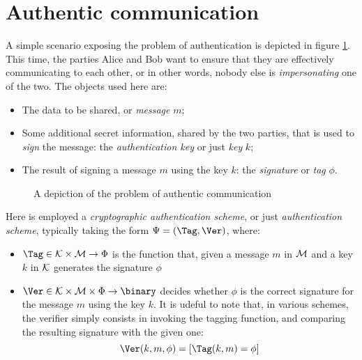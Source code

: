 
\section{Authentic communication}


A simple scenario exposing the problem of authentication is depicted in figure \ref{fig:authentication}. This time, the parties Alice and Bob want to ensure that they are effectively communicating to each other, or in other words, nobody else is \emph{impersonating} one of the two. The objects used here are:
\begin{itemize}
    \item The data to be shared, or \emph{message} $m$;
    \item Some additional secret information, shared by the two parties, that is used to \emph{sign} the message: the \emph{authentication key} or just \emph{key} $k$;
    \item The result of signing a message $m$ using the key $k$: the \emph{signature} or \emph{tag} $\phi$.
\end{itemize}

\begin{figure}[ht]
    \centering

    \caption{A depiction of the problem of authentic communication}
    \label{fig:authentication}
\end{figure}

Here is employed a \emph{cryptographic authentication scheme}, or just \emph{authentication scheme}, typically taking the form $\Psi = (\Tag, \Ver)$, where:
\begin{itemize}
    \item $\Tag \in \K \times \M \to \Phi$ is the function that, given a message $m$ in $\mathcal{M}$ and a key $k$ in $\mathcal{K}$ generates the signature $\phi$
    \item $\Ver \in \K \times \M \times \Phi \to \binary$ decides whether $\phi$ is the correct signature for the message $m$ using the key $k$. It is udeful to note that, in various schemes, the verifier simply consists in invoking the tagging function, and comparing the resulting signature with the given one:
    \[
        \Ver(k, m, \phi) = [\Tag(k, m) = \phi]
    \]
\end{itemize}

